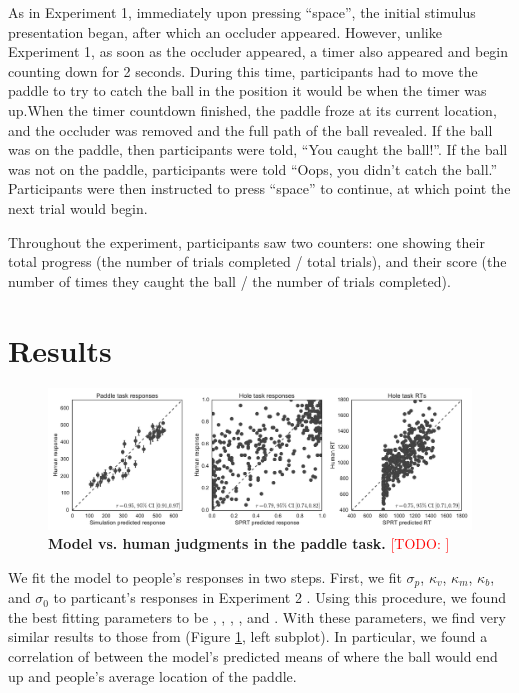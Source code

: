 \documentclass[10pt,letterpaper]{article}
\newcommand{\TODO}[1]{\textcolor{red}{[TODO: #1]}}
\begin{document}
As in Experiment 1, immediately upon pressing ``space'', the initial stimulus presentation began, after which an occluder appeared. However, unlike Experiment 1, as soon as the occluder appeared, a timer also appeared and begin counting down for 2 seconds. During this time, participants had to move the paddle to try to catch the ball in the position it would be when the timer was up.When the timer countdown finished, the paddle froze at its current location, and the occluder was removed and the full path of the ball revealed. If the ball was on the paddle, then participants were told, ``You caught the ball!''. If the ball was not on the paddle, participants were told ``Oops, you didn't catch the ball.'' Participants were then instructed to press ``space'' to continue, at which point the next trial would begin.

Throughout the experiment, participants saw two counters: one showing their total progress (the number of trials completed / total trials), and their score (the number of times they caught the ball / the number of trials completed).

\section{Results}

\begin{figure}[t]
    \begin{center}
        \includegraphics[width=\textwidth]{figures/model_results.pdf}
        \caption{\textbf{Model vs. human judgments in the paddle task.} \TODO{}}
        \label{fig:model-results}
    \end{center}
\end{figure}

We fit the model to people's responses in two steps. First, we fit $\sigma_p$, $\kappa_v$, $\kappa_m$, $\kappa_b$, and $\sigma_0$ to particant's responses in Experiment 2 \cite<for details, see>{Smith:2013fc}. Using this procedure, we found the best fitting parameters to be \perr{}, \kapv{}, \kapm{}, \kapb{}, and \sdzero{}. With these parameters, we find very similar results to those from  (Figure \ref{fig:model-results}, left subplot). In particular, we found a correlation of \PaddleCorr{} between the model's predicted means of where the ball would end up and people's average location of the paddle.
\end{document}
